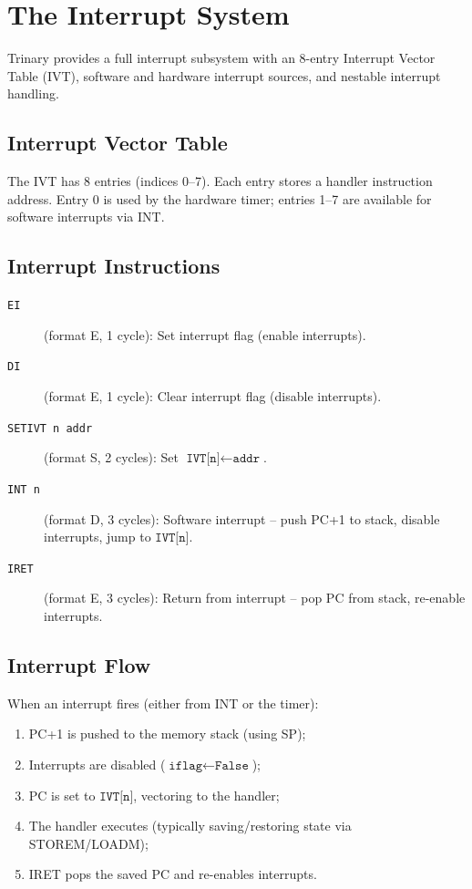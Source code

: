 \documentclass[10pt,a4paper,twoside]{book}
\begin{document}
\chapter{The Interrupt System}
\label{ch:interrupts}

Trinary provides a full interrupt subsystem with an 8-entry Interrupt Vector Table
(IVT), software and hardware interrupt sources, and nestable interrupt handling.

\section{Interrupt Vector Table}

The IVT has 8 entries (indices 0--7). Each entry stores a handler instruction address.
Entry 0 is used by the hardware timer; entries 1--7 are available for software
interrupts via INT.

\section{Interrupt Instructions}

\begin{description}
    \item[\texttt{EI}] (format E, 1 cycle): Set interrupt flag (enable interrupts).
    \item[\texttt{DI}] (format E, 1 cycle): Clear interrupt flag (disable interrupts).
    \item[\texttt{SETIVT n addr}] (format S, 2 cycles): Set $\texttt{IVT[n]} \gets
          \texttt{addr}$.
    \item[\texttt{INT n}] (format D, 3 cycles): Software interrupt -- push PC+1 to
          stack, disable interrupts, jump to $\texttt{IVT[n]}$.
    \item[\texttt{IRET}] (format E, 3 cycles): Return from interrupt -- pop PC from
          stack, re-enable interrupts.
\end{description}

\section{Interrupt Flow}

When an interrupt fires (either from INT or the timer):
\begin{enumerate}
    \item PC+1 is pushed to the memory stack (using SP);
    \item Interrupts are disabled ($\texttt{iflag} \gets \texttt{False}$);
    \item PC is set to $\texttt{IVT[n]}$, vectoring to the handler;
    \item The handler executes (typically saving/restoring state via STOREM/LOADM);
    \item IRET pops the saved PC and re-enables interrupts.
\end{enumerate}
\end{document}
